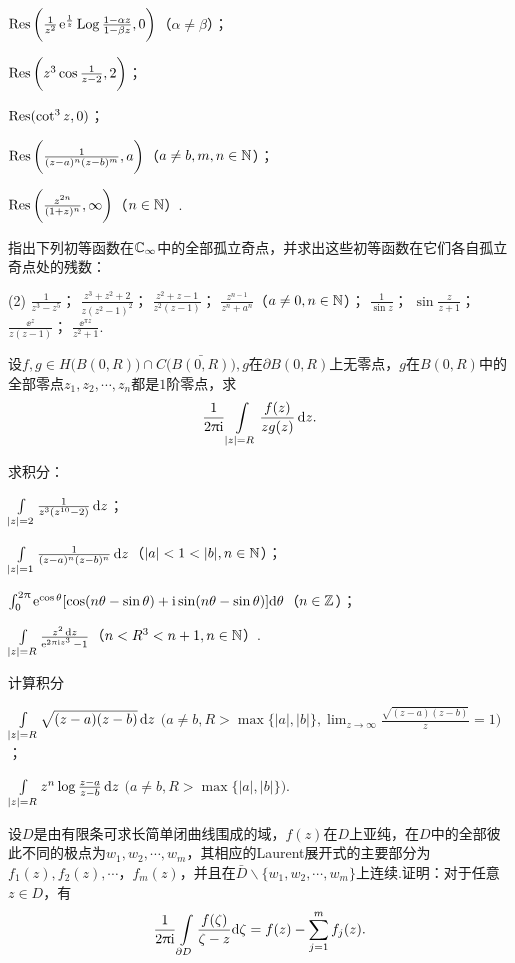 \begin{xiti}
\begin{enuma}
  \item $\operatorname*{Res}\bigg(\frac1{z^2}\operatorname{\!\!\;\mathrm e}^{\frac1z}\operatorname{Log}\frac{1-\alpha z}{1-\beta z},0\bigg)
  $（$\alpha\ne\beta$）；
  \item $\operatorname*{Res}\bigg(z^3\cos\frac1{z-2},2\bigg)$；
  \item $\operatorname*{Res}(\cot^3z,0)$；
  \item $\operatorname*{Res}\bigg(\frac1{(z-a)^n(z-b)^m},a\bigg)$（$a\ne b,m,n\in\mathbb N$）；
  \item $\operatorname*{Res}\bigg(\frac{z^{2n}}{(1+z)^n},\infty\bigg)$（$n\in\mathbb N$）.
\end{enuma}
\item 指出下列初等函数在$\mathbb C_\infty$中的全部孤立奇点，并求出这些初等函数在它们各自孤立奇点处的残数：
\begin{tasks}(2)
\task $\frac1{z^3-z^5}$；
\task $\frac{z^3+z^2+2}{z(z^2-1)^2}$；
\task $\frac{z^2+z-1}{z^2(z-1)}$；
\task $\frac{z^{n-1}}{z^n+a^n}$（$a\ne0,n\in\mathbb N$）；
\task $\frac1{\sin z}$；
\task $\sin\frac z{z+1}$；
\task $\frac{\ee^z}{z(z-1)}$；
\task $\frac{\ee^{\pi z}}{z^2+1}$.
\end{tasks}
\item 设$f,g\in H\big(B(0,R)\big)\cap C\big(\bar{B(0,R)}\big),g$在$\partial B(0,R)$上无零点，$g$在$B(0,R)$中的全部零点$z_1,z_2,\cdots,z_n$都是$1$阶零点，求
    \[\frac1{2\uppi\mathrm i}\int\limits_{|z|=R}\frac{f(z)}{zg(z)}\mathop{}\!\mathrm dz.\]
\item 求积分：
\begin{enuma}
  \item $\int\limits_{|z|=2}\frac1{z^3(z^{10}-2)}\mathop{}\!\mathrm dz$；
  \item $\int\limits_{|z|=1}\frac1{(z-a)^n(z-b)^n}\mathop{}\!\mathrm dz$（$|a|<1<|b|,n\in\MN$）；
  \item $\int_0^{2\uppi}\operatorname{\!\!\;\mathrm e}^{\cos\theta}[\cos(n\theta-\sin\theta)+\mathrm i
  \sin(n\theta-\sin\theta)]\textrm d\theta$（$n\in\mathbb Z$）；
  \item $\int\limits_{|z|=R}\frac{z^2\mathop{}\!\mathrm dz}{\operatorname{\!\!\;\mathrm e}^{2\uppi\mathrm i z^3}-1}$（$n<R^3<n+1,n\in\mathbb N$）.
\end{enuma}
\item 计算积分
\begin{enuma}
  \item $\int\limits_{|z|=R}\sqrt{(z-a)(z-b)}\mathop{}\!\mathrm dz$ $\bigg(a\ne b,R>\max\{|a|,|b|\},
  \lim_{z\to\infty}\frac{\sqrt{(z-a)(z-b)}}z=1\bigg)$；
  \item $\int\limits_{|z|=R}z^n\log\frac{z-a}{z-b}\mathop{}\!\mathrm dz$ $\big(a\ne b,R>\max\{|a|,|b|\}\big)$.
\end{enuma}
\item 设$D$是由有限条可求长简单闭曲线围成的域，$f(z)$在$D$上亚纯，在$D$中的全部彼此不同的极点为$w_1,w_2,\cdots,w_m$，其相应的Laurent展开式的主要部分为$f_1(z),f_2(z),\cdots$，$f_m(z)$，并且在$\bar D\backslash\{w_1,w_2,\cdots,w_m\}$上连续.证明：对于任意$z\in D$，有
    \[\frac1{2\uppi\mathrm i}\int\limits_{\partial D}\frac{f(\zeta)}{\zeta-z}\textrm d\zeta=f(z)-\sum_{j=1}^mf_j(z).\]
\end{xiti}

